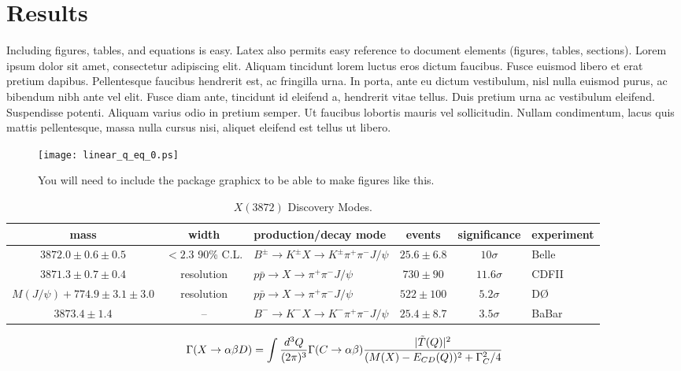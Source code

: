\documentclass[aps,floatfix,prd,showpacs]{revtex4}
\begin{document}
\section{Results}
Including figures, tables, and equations is easy. Latex also permits easy reference to document elements (figures, tables, sections). Lorem ipsum dolor sit amet, consectetur adipiscing elit. Aliquam tincidunt lorem luctus eros dictum faucibus. Fusce euismod libero et erat pretium dapibus. Pellentesque faucibus hendrerit est, ac fringilla urna. In porta, ante eu dictum vestibulum, nisl nulla euismod purus, ac bibendum nibh ante vel elit. Fusce diam ante, tincidunt id eleifend a, hendrerit vitae tellus. Duis pretium urna ac vestibulum eleifend. Suspendisse potenti. Aliquam varius odio in pretium semper. Ut faucibus lobortis mauris vel sollicitudin. Nullam condimentum, lacus quis mattis pellentesque, massa nulla cursus nisi, aliquet eleifend est tellus ut libero.

\begin{figure}[ht]
\texttt{[image: linear\_q\_eq\_0.ps]}
\caption{You will need to include the package graphicx to be able to make figures like this.}
\label{fig1}
\end{figure}

\begin{table}[ht]
\caption{$X(3872)$ Discovery Modes.}
\label{XmodesTab}
\begin{tabular}{cclccl}
\hline
mass & width & production/decay mode & events & significance & experiment\\
\hline
\hline
$3872.0 \pm 0.6 \pm 0.5$  & $< 2.3$ 90\% C.L.  & $B^\pm \to K^\pm X \to K^\pm \pi^+ \pi^- J/\psi$   &  $25.6 \pm 6.8$ & $10 \sigma$     & Belle\\
$3871.3 \pm 0.7 \pm 0.4$  & resolution & $p\bar p \to  X \to \pi^+ \pi^- J/\psi$   &  $730 \pm 90$ & $11.6 \sigma$  & CDFII\\
$M(J/\psi) + 774.9 \pm 3.1 \pm 3.0$ & resolution & $p\bar p \to X \to \pi^+\pi^-J/\psi$ & $522 \pm 100$ & $5.2 \sigma$  & D{\O} \\
$3873.4 \pm 1.4$  &  --  & $B^- \to K^- X \to K^- \pi^+ \pi^- J/\psi$   &  $25.4 \pm 8.7$ &$3.5 \sigma$ & BaBar\\
\hline
\hline
\end{tabular}
\end{table}

\begin{equation}
\Gamma(X \to \alpha\beta D) = \int {d^3Q\over (2\pi)^3}  \Gamma(C\to \alpha\beta) {|\tilde T(Q)|^2 \over
(M(X) - E_{CD}(Q))^2 + \Gamma_C^2/4}
\label{XCD}
\end{equation}
\end{document}

